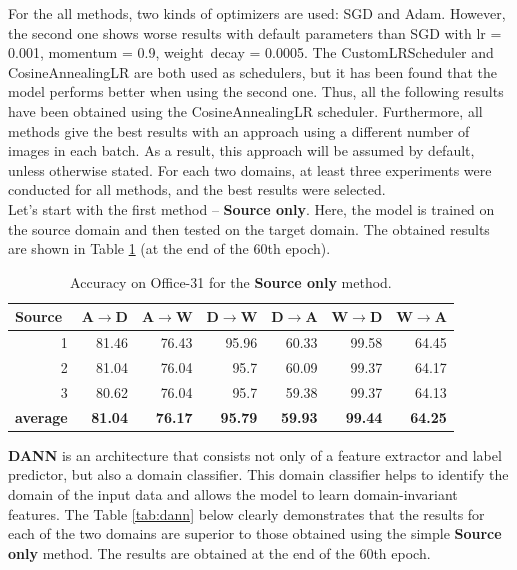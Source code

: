 For the all methods, two kinds of optimizers are used: SGD and Adam. However, the second one shows worse results with default parameters than SGD with lr = 0.001, momentum = 0.9, weight~decay = 0.0005. The CustomLRScheduler and CosineAnnealingLR are both used as schedulers, but it has been found that the model performs better when using the second one. Thus, all the following results have been obtained using the CosineAnnealingLR scheduler. Furthermore, all methods give the best results with an approach using a different number of images in each batch. As a result, this approach will be assumed by default, unless otherwise stated. For each two domains, at least three experiments were conducted for all methods, and the best results were selected.\\

Let's start with the first method -- \textbf{Source only}. Here, the model is trained on the source domain and then tested on the target domain. The obtained results are shown in Table \ref{tab:source} (at the end of the 60th epoch).

\begin{table}[h]
\centering
\caption{Accuracy on Office-31 for the \textbf{Source only} method.}
\label{tab:source}
\begin{tabular}{|r|r|r|r|r|r|r|}
\hline
\multicolumn{1}{|l|}{Source} & \multicolumn{1}{l|}{A$\rightarrow$D} & \multicolumn{1}{l|}{A$\rightarrow$W} & \multicolumn{1}{l|}{D$\rightarrow$W} & \multicolumn{1}{l|}{D$\rightarrow$A} & \multicolumn{1}{l|}{W$\rightarrow$D} & \multicolumn{1}{l|}{W$\rightarrow$A} \\ \hline
1 & 81.46 & 76.43 & 95.96 & 60.33 & 99.58 & 64.45 \\ \hline
2 & 81.04 & 76.04 & 95.7 & 60.09 & 99.37 & 64.17 \\ \hline
3 & 80.62 & 76.04 & 95.7 & 59.38 & 99.37 & 64.13 \\ \hline
\multicolumn{1}{|l|}{\textbf{average}} & \textbf{81.04} & \textbf{76.17} & \textbf{95.79} & \textbf{59.93} & \textbf{99.44} & \textbf{64.25} \\ \hline
\end{tabular}
\end{table}

\textbf{DANN} is an architecture that consists not only of a feature extractor and label predictor, but also a domain classifier. This domain classifier helps to identify the domain of the input data and allows the model to learn domain-invariant features. The Table \ref{tab:dann} below clearly demonstrates that the results for each of the two domains are superior to those obtained using the simple \textbf{Source only} method. The results are obtained at the end of the 60th epoch.


